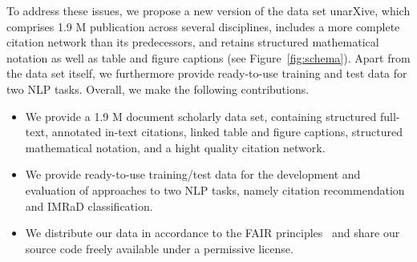 %
%
%
%


To address these issues, we propose a new version of the data set unarXive, %
which comprises 1.9 M publication across several disciplines, includes a more complete citation network than its predecessors, and retains structured mathematical notation as well as table and figure captions (see Figure~\ref{fig:schema}).  %
Apart from the data set itself, we furthermore provide ready-to-use training and test data for two NLP tasks. Overall, we make the following contributions.


\begin{itemize}
    \item We provide a 1.9 M document scholarly data set, containing structured full-text, annotated in-text citations, linked table and figure captions, structured mathematical notation, and a hight quality citation network.
    \item We provide ready-to-use training/test data for the development and evaluation of approaches to two NLP tasks, namely citation recommendation and IMRaD classification.
    \item We distribute our data in accordance to the FAIR principles~\cite{Wilkinson2016} and share our source code freely available under a permissive license.
\end{itemize}

